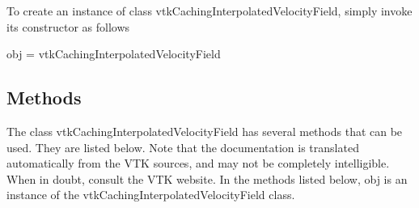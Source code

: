 To create an instance of class vtk\-Caching\-Interpolated\-Velocity\-Field, simply invoke its constructor as follows \begin{DoxyVerb}  obj = vtkCachingInterpolatedVelocityField
\end{DoxyVerb}
 \hypertarget{vtkwidgets_vtkxyplotwidget_Methods}{}\subsection{Methods}\label{vtkwidgets_vtkxyplotwidget_Methods}
The class vtk\-Caching\-Interpolated\-Velocity\-Field has several methods that can be used. They are listed below. Note that the documentation is translated automatically from the V\-T\-K sources, and may not be completely intelligible. When in doubt, consult the V\-T\-K website. In the methods listed below, {\ttfamily obj} is an instance of the vtk\-Caching\-Interpolated\-Velocity\-Field class. 

